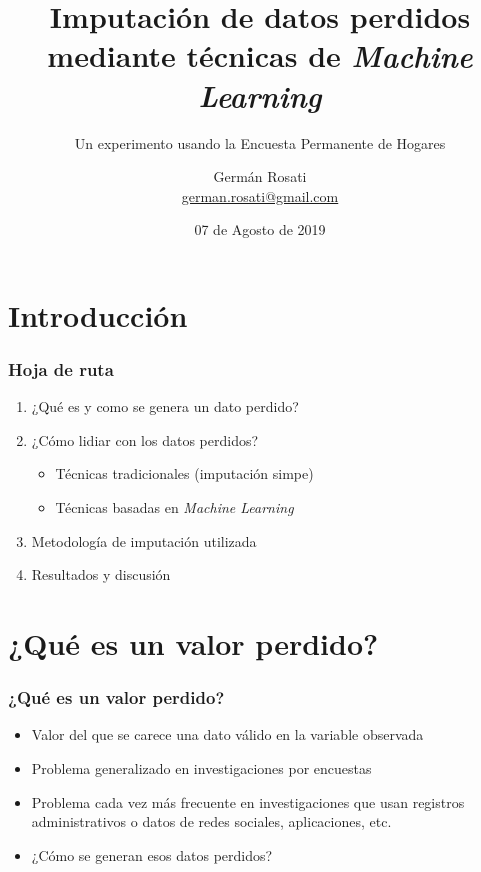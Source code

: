 \documentclass{beamer}
\title[Imputación usando Ensamble Learning]{Imputación de datos perdidos mediante técnicas de \textit{Machine Learning}}
\subtitle{Un experimento usando la Encuesta Permanente de Hogares}
\author{Germán Rosati \\ \href{mailto: german.rosati@gmail.com}{german.rosati@gmail.com}}
\institute{IDAES-UNSAM / PIMSA / UNTREF}
\date{07 de Agosto de 2019}
\begin{document}
\frame{\titlepage}


\section{Introducción}
\begin{frame}
	\frametitle{Hoja de ruta}
	\begin{enumerate}
		\item ¿Qué es y como se genera un dato perdido?
		\item ¿Cómo lidiar con los datos perdidos?
		\begin{itemize}
			\item Técnicas tradicionales (imputación simpe)
			\item Técnicas basadas en \textit{Machine Learning}
		\end{itemize}
		\item Metodología de imputación utilizada
		\item Resultados y discusión
	\end{enumerate}
\end{frame}

\section{¿Qué es un valor perdido?}
\begin{frame}
\frametitle{¿Qué es un valor perdido?}
	\begin{itemize}
		\item{Valor del que se carece una dato válido en la variable observada}
		\item{Problema generalizado en investigaciones por encuestas}
		\item{Problema cada vez más frecuente en investigaciones que usan registros administrativos o datos de redes sociales, aplicaciones, etc.}
		\item{¿Cómo se generan esos datos perdidos?}
	\end{itemize}
\end{frame}
\end{document}
